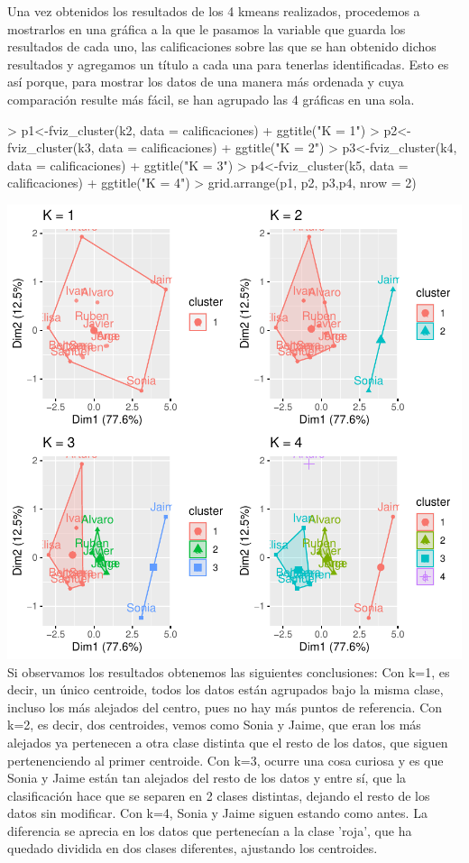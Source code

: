 \documentclass[a4paper]{article}
\begin{document}
Una vez obtenidos los resultados de los 4 kmeans realizados, procedemos a mostrarlos en una gráfica a la que le pasamos la variable que guarda los resultados de cada uno, las calificaciones sobre las que se han obtenido dichos resultados y agregamos un título a cada una para tenerlas identificadas.
Esto es así porque, para mostrar los datos de una manera más ordenada y cuya comparación resulte más fácil, se han agrupado las 4 gráficas en una sola.

\begin{Schunk}
\begin{Sinput}
> p1<-fviz_cluster(k2, data = calificaciones) + ggtitle("K = 1")
> p2<-fviz_cluster(k3, data = calificaciones) + ggtitle("K = 2")
> p3<-fviz_cluster(k4, data = calificaciones) + ggtitle("K = 3")
> p4<-fviz_cluster(k5, data = calificaciones) + ggtitle("K = 4")
> grid.arrange(p1, p2, p3,p4, nrow = 2)
\end{Sinput}
\end{Schunk}
\includegraphics{practica4-graficas2}
\\

Si observamos los resultados obtenemos las siguientes conclusiones:
Con k=1, es decir, un único centroide, todos los datos están agrupados bajo la misma clase, incluso los más alejados del centro, pues no hay más puntos de referencia.
Con k=2, es decir, dos centroides, vemos como Sonia y Jaime, que eran los más alejados ya pertenecen a otra clase distinta que el resto de los datos, que siguen pertenenciendo al primer centroide.
Con k=3, ocurre una cosa curiosa y es que Sonia y Jaime están tan alejados del resto de los datos y entre sí, que la clasificación hace que se separen en 2 clases distintas, dejando el resto de los datos sin modificar.
Con k=4, Sonia y Jaime siguen estando como antes. La diferencia se aprecia en los datos que pertenecían a la clase 'roja', que ha quedado dividida en dos clases diferentes, ajustando los centroides.
\end{document}
